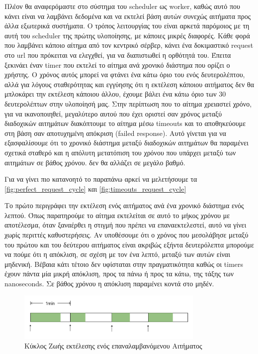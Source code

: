 Πλέον θα αναφερόμαστε στο σύστημα του scheduler ως worker, καθώς αυτό που κάνει είναι να λαμβάνει δεδομένα και να
εκτελεί βάση αυτών συνεχώς αιτήματα προς άλλα εξωτερικά συστήματα. Ο τρόπος λειτουργίας του είναι αρκετά παρόμοιος
με τη αυτή του scheduler της πρώτης υλοποίησης, με κάποιες μικρές διαφορές. Κάθε φορά που λαμβάνει κάποιο αίτημα από τον κεντρικό σέρβερ, κάνει ένα δοκιμαστικό request
στο url που πρόκειται να ελεγχθεί, για να διαπιστωθεί η ορθότητά του. Έπειτα ξεκινάει έναν timer που εκτελεί το αίτημα ανά
χρονικό διάστημα που ορίζει ο χρήστης. Ο χρόνος αυτός μπορεί να φτάνει ένα κάτω όριο του ενός δευτερολέπτου, αλλά για λόγους σταθερότητας και
εγγύησης ότι η εκτέλεση κάποιου αιτήματος δεν θα μπλοκάρει την εκτέλεση κάποιου άλλου, έχουμε βάλει ένα κάτω όριο των 30 δευτερολέπτων στην υλοποίησή μας.
Στην περίπτωση που το αίτημα χρειαστεί χρόνο, για να ικανοποιηθεί, μεγαλύτερο αυτού που έχει οριστεί σαν χρόνος μεταξύ
διαδοχικών αιτημάτων διακόπτουμε το αίτημα μέσω timeouts και το αποθηκεύουμε στη βάση σαν αποτυχημένη απόκριση (failed response).
Αυτό γίνεται για να εξασφαλίσουμε ότι το χρονικό διάστημα μεταξύ διαδοχικών αιτημάτων θα παραμένει
σχετικά σταθερό και η απόλυτη μετατόπιση του χρόνου που υπάρχει μεταξύ των αιτημάτων σε βάθος χρόνου. 
δεν θα αλλάζει σε μεγάλο βαθμό.

Για να γίνει πιο κατανοητό το παραπάνω αρκεί να μελετήσουμε τα \autoref{fig:perfect_request_cycle} και \autoref{fig:timeouts_request_cycle}

Το πρώτο περιγράφει την εκτέλεση ενός αιτήματος ανά ένα χρονικό διάστημα ενός λεπτού. Όπως παρατηρούμε το
αίτημα εκτελείται σε αυτό το μήκος χρόνου με αποτέλεσμα, όταν ξαναέρθει η στιγμή που πρέπει να επαναεκτελεστεί,
αυτό να γίνει χωρίς περιττές καθυστερήσεις. Αν υποθέσουμε ότι ο χρόνος που μεσολάβησε μεταξύ του πρώτου και του δεύτερου αιτήματος
είναι ακριβώς εξήντα δευτερόλεπτα μπορούμε να πούμε ότι η απόκλιση, σε σχέση με τον ένα λεπτό, μεταξύ των αυτών είναι μηδενική.
Βέβαια κάτι τέτοιο δεν υφίσταται στην πραγματικότητα καθώς οι timers έχουν πάντα μία μικρή απόκλιση, προς τα πάνω ή προς τα κάτω, της τάξης των nanoseconds.
Σε βάθος χρόνου η απόκλιση παραμένει κοντά στο μηδέν.

\begin{figure}[!ht]
	\centering
	\includegraphics[width=0.8\textwidth]{./images/chapter4/perfect_request_cycle.png}
	\caption[Κύκλος Ζωής εκτέλεσης ενός επαναλαμβανόμενου Αιτήματος]{Κύκλος Ζωής εκτέλεσης ενός επαναλαμβανόμενου Αιτήματος}
	\label{fig:perfect_request_cycle}
\end{figure}

